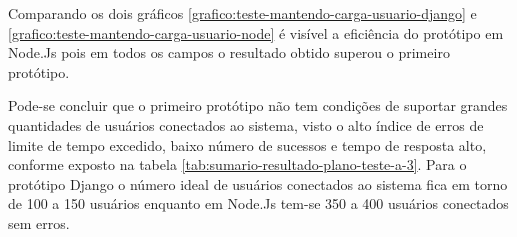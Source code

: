   Comparando os dois gráficos \ref{grafico:teste-mantendo-carga-usuario-django} e \ref{grafico:teste-mantendo-carga-usuario-node} é
  visível a eficiência do protótipo em Node.Js pois em todos os campos o resultado obtido superou o primeiro protótipo.
  
  Pode-se concluir que o primeiro protótipo não tem condições de suportar grandes quantidades de usuários conectados ao
  sistema, visto o alto índice de erros de limite de tempo excedido, baixo número de sucessos e tempo de resposta alto, 
  conforme exposto na tabela \ref{tab:sumario-resultado-plano-teste-a-3}. Para o protótipo Django o número ideal de usuários
  conectados ao sistema fica em torno de 100 a 150 usuários enquanto em Node.Js tem-se 350 a 400 usuários conectados sem 
  erros.
  
  